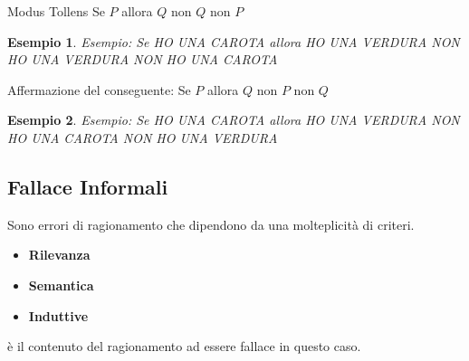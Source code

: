 \documentclass{article}
\newtheorem{exmp}{Esempio}[section]
\theoremstyle{definition}
\begin{document}
\begin{tcolorbox}
        Modus Tollens\newline 
        Se $ P $ allora $ Q $ \newline
        non $ Q $ \newline 
        non $ P $ \newline
\end{tcolorbox}
\begin{exmp}
        Esempio: \newline
        Se HO UNA CAROTA allora HO UNA VERDURA \newline
        NON HO UNA VERDURA \newline 
        NON HO UNA CAROTA \newline
\end{exmp}


\begin{tcolorbox}
        Affermazione del conseguente: \newline
        Se $ P $ allora $ Q $ \newline
        non $ P $ \newline
        non $ Q $ \newline 
\end{tcolorbox}
\begin{exmp}
        Esempio: \newline
        Se HO UNA CAROTA allora HO UNA VERDURA \newline
        NON HO UNA CAROTA \newline
        NON HO UNA VERDURA \newline 
\end{exmp}



\subsection{Fallace Informali}
Sono errori di ragionamento che dipendono da una molteplicità di criteri. \par
\begin{itemize}
        \item \textbf{Rilevanza}
        \item \textbf{Semantica}
        \item\textbf{Induttive}
\end{itemize}
è il contenuto del ragionamento ad essere fallace in questo caso.
\end{document}
